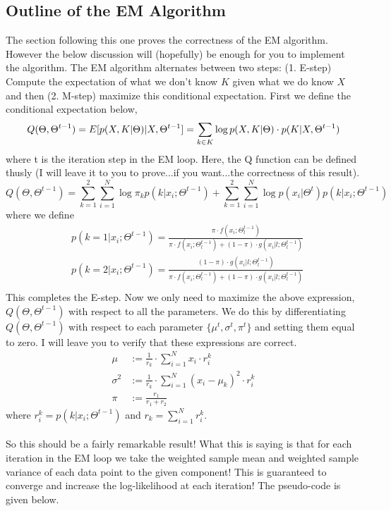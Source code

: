 \subsection{Outline of the EM Algorithm}
The section following this one proves the correctness of the EM algorithm. However the below discussion will (hopefully) be enough for you to implement the algorithm. The EM algorithm alternates between two steps: (1. E-step) Compute the expectation of what we don't know $K$ given what we do know $X$ and then (2. M-step) maximize this conditional expectation. First we define the conditional expectation below,
\begin{equation}
Q(\Theta,\Theta^{t-1})=E[p(X,K|\Theta)|X, \Theta^{t-1}] = \sum_{k\in K}\log p(X,K| \Theta)\cdot p(K|X, \Theta^{t-1})\\
\end{equation}
where t is the iteration step in the EM loop. Here, the Q function can be defined thusly (I will leave it to you to prove...if you want...the correctness of this result).
\begin{equation}
Q(\Theta,\Theta^{t-1})=\sum_{k=1}^2\sum_{i=1}^N\log\pi_kp(k|x_i; \Theta^{t-1}) + \sum_{k=1}^2\sum_{i=1}^N\log p(x_i|\Theta^t) p(k|x_i; \Theta^{t-1})
\end{equation}
where we define 
\begin{equation}
\begin{split}
&p(k=1|x_i;\Theta^{t-1}) = \frac{ \pi\cdot f(x_i ;\Theta_l^{t-1}) }{ \pi\cdot f(x_i ;\Theta_l^{t-1}) + (1-\pi)\cdot g(x_i|l;\Theta_l^{t-1}) } \\
&p(k=2|x_i;\Theta^{t-1}) = \frac{   (1-\pi)\cdot g(x_i|l;\Theta_l^{t-1}) }{ \pi\cdot f(x_i ;\Theta_l^{t-1}) + (1-\pi)\cdot g(x_i|l;\Theta_l^{t-1}) } \\
\end{split}
\end{equation}
This completes the E-step. Now we only need to maximize the above expression, $Q(\Theta, \Theta^{t-1})$ with respect to all the parameters. We do this by differentiating $Q(\Theta, \Theta^{t-1})$ with respect to each parameter $\{\mu^t, \sigma^t , \pi^t \}$ and setting them equal to zero. I will leave you to verify that these expressions are correct. 
\begin{align}
\mu &:=\frac{1}{r_k}\cdot\sum_{i=1}^Nx_i\cdot r_i^k   \\
\sigma^2 &:=\frac{1}{r_k}\cdot\sum_{i=1}^N(x_i-\mu_k)^2\cdot r_i^k     \\
\pi &:= \frac{r_1}{r_1 + r_2}  
\end{align}
where $r_i^k = p(k|x_i;\Theta^{t-1})$ and $r_k = \sum_{i=1}^Nr_i^k$. 
\\
\\
\noindent
So this should be a fairly remarkable result! What this is saying is that for each iteration in the EM loop we take the weighted sample mean and weighted sample variance of each data point to the given component! This is guaranteed to converge and increase the log-likelihood at each iteration! The pseudo-code is given below. 

